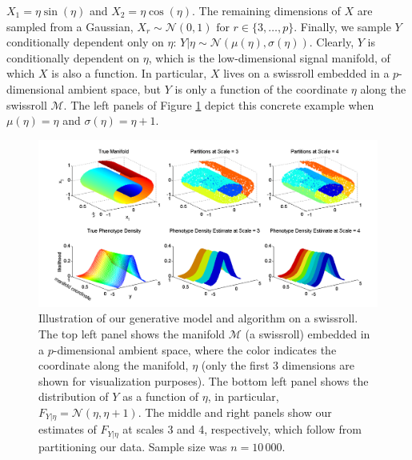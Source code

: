 \documentclass{article} %
\providecommand{\mc}[1]{\mathcal{#1}}
\begin{document}
	$X_1 = \eta \sin (\eta)$ and
	$X_2 = \eta \cos (\eta)$.
	The remaining dimensions of $X$ are sampled from a Gaussian,
$X_r \sim \mc{N}(0,1) \text{ for } r \in \{3, \ldots, p\}$.
Finally, we sample $Y$ conditionally dependent only on $\eta$: 	$Y | \eta \sim \mc{N}(\mu(\eta) ,\sigma(\eta))$.
Clearly, $Y$ is conditionally dependent on ${\eta}$, which is the low-dimensional signal manifold, of which $X$ is also a function.  In particular, $X$ lives on a swissroll embedded in a $p$-dimensional ambient space, but $Y$ is only a function of the coordinate ${\eta}$ along the swissroll $\mc{M}$. The left panels of Figure \ref{fig:swiss} depict this concrete example when $\mu(\eta)=\eta$ and $\sigma(\eta)=\eta + 1$.


\begin{figure}[htbp]
	\centering
		\includegraphics[width=1\linewidth]{../figs/PartitionsDensity_27MAY}
	\caption{Illustration of our generative model and algorithm on a swissroll. The top left panel shows the manifold $\mc{M}$ (a swissroll) embedded in a $p$-dimensional ambient space, where the color indicates the coordinate along the manifold, $\eta$ (only the first 3 dimensions are shown for visualization purposes). The bottom left panel shows the distribution of $Y$ as a function of $\eta$, in particular, $F_{Y|\eta}=\mc{N}({\eta},{\eta}+1)$. The middle and right panels show our estimates of $F_{Y|{\eta}}$ at scales 3 and 4, respectively, which follow from partitioning our data.  Sample size was $n=10\,000$.}
	\label{fig:swiss}
\vskip -10pt
\end{figure}
\end{document}
